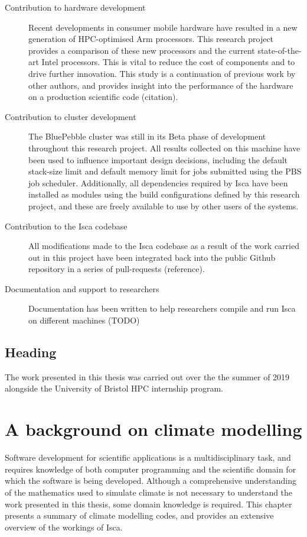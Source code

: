 \documentclass[a4paper,11pt]{report}
\begin{document}
\begin{description}
	\item[Contribution to hardware development] Recent developments in consumer mobile hardware have resulted in a new generation of HPC-optimised Arm processors. This research project provides a comparison of these new processors and the current state-of-the-art Intel processors. This is vital to reduce the cost of components and to drive further innovation. This study is a continuation of previous work by other authors, and provides insight into the performance of the hardware on a production scientific code (citation).
	
	\item[Contribution to cluster development] The BluePebble cluster was still in its Beta phase of development throughout this research project. All results collected on this machine have been used to influence important design decisions, including the default stack-size limit and default memory limit for jobs submitted using the PBS job scheduler. Additionally, all dependencies required by Isca have been installed as modules using the build configurations defined by this research project, and these are freely available to use by other users of the systems. 
	
	\item[Contribution to the Isca codebase] All modifications made to the Isca codebase as a result of the work carried out in this project have been integrated back into the public Github repository in a series of pull-requests (reference). 
	
	\item[Documentation and support to researchers] Documentation has been written to help researchers compile and run Isca on different machines (TODO)
	
\end{description}


\section{Heading}
The work presented in this thesis was carried out over the the summer of 2019 alongside the University of Bristol HPC internship program. 




\chapter{A background on climate modelling}
\label{chap:background}
Software development for scientific applications is a multidisciplinary task, and requires knowledge of both computer programming and the scientific domain for which the software is being developed. Although a comprehensive understanding of the mathematics used to simulate climate is not necessary to understand the work presented in this thesis, some domain knowledge is required. This chapter presents a summary of climate modelling codes, and provides an extensive overview of the workings of Isca.
\end{document}
